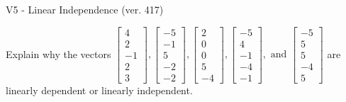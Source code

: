 \begin{exercise}
  \begin{exerciseTitle}V5 - Linear Independence (ver. 417)\end{exerciseTitle}
  \begin{exerciseStatement}
    Explain why the vectors \(\left[\begin{array}{r}
4 \\
2 \\
-1 \\
2 \\
3
\end{array}\right] , \left[\begin{array}{r}
-5 \\
-1 \\
5 \\
-2 \\
-2
\end{array}\right] , \left[\begin{array}{r}
2 \\
0 \\
0 \\
5 \\
-4
\end{array}\right] , \left[\begin{array}{r}
-5 \\
4 \\
-1 \\
-4 \\
-1
\end{array}\right] , \text{ and } \left[\begin{array}{r}
-5 \\
5 \\
5 \\
-4 \\
5
\end{array}\right]\) are linearly dependent or linearly independent.	



\end{exerciseStatement}
\end{exercise}
